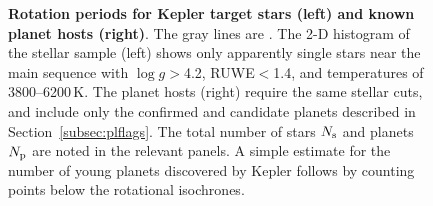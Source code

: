 \documentclass[11pt,twocolumn,tighten]{aastex63}
\begin{document}
\begin{figure}[!t]
	\begin{center}
	\end{center}
	\vspace{-0.5cm}
	\caption{
    {\bf Rotation periods for Kepler target stars (left) and known
    planet hosts (right)}.  The gray lines are .  The 2-D histogram of the
    stellar sample (left) shows only apparently single stars near
    the main sequence with $\log g$$>$4.2, RUWE$<$1.4, and
    temperatures of 3800--6200\,K.  The planet hosts (right) require
    the same stellar cuts, and include only the confirmed and
    candidate planets described in Section~\ref{subsec:plflags}.  The
    total number of stars $N_{\rm s}$ and planets $N_{\rm p}$ are noted in
    the relevant panels.  A simple estimate for the number of young
    planets discovered by Kepler follows by counting points below the
    rotational isochrones.
	}
	\label{fig:prot_vs_teff}
\end{figure}
\end{document}
